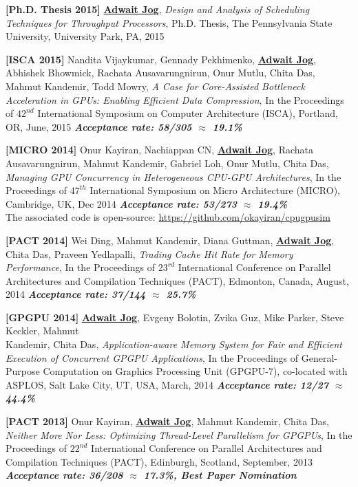 \documentclass[10pt,a4]{article}
\begin{document}
\begin{description}
\item 
{\bf [Ph.D. Thesis 2015]}
{\bf \underline{Adwait Jog}}, {\it Design and Analysis of Scheduling Techniques for Throughput Processors}, 
Ph.D. Thesis, The Pennsylvania State University, University Park, PA, 2015

\item 
{\bf [ISCA 2015]}
Nandita Vijaykumar, Gennady Pekhimenko, {\bf \underline{Adwait Jog}}, Abhishek Bhowmick, Rachata Ausavarungnirun, Onur Mutlu, Chita Das, Mahmut Kandemir, Todd Mowry,
{\it A Case for Core-Assisted Bottleneck Acceleration in GPUs: Enabling Efficient Data Compression},
In the Proceedings of $42^{nd}$ International Symposium on Computer Architecture (ISCA), Portland, OR, June, 2015
\textbf{\textit{Acceptance rate: 58/305 $\approx$ 19.1\%}}

\item{\bf [MICRO 2014]} 
Onur Kayiran, Nachiappan CN, {\bf \underline{Adwait Jog}}, Rachata Ausavarungnirun, 
Mahmut Kandemir, Gabriel Loh, Onur Mutlu, Chita Das, 
{\it Managing GPU Concurrency in Heterogeneous CPU-GPU Architectures}, 
In the Proceedings of $47^{th}$ International Symposium on Micro Architecture (MICRO), Cambridge, UK, Dec 2014
\textbf{\textit{Acceptance rate: 53/273 $\approx$ 19.4\%}} \\
The associated code is open-source: \url{https://github.com/okayiran/cpugpusim}

\item{\bf [PACT 2014]}
Wei Ding, Mahmut Kandemir, Diana Guttman, {\bf \underline{Adwait Jog}}, Chita Das, Praveen Yedlapalli, 
{\it Trading Cache Hit Rate for Memory Performance}, 
In the Proceedings of $23^{rd}$ International Conference on Parallel Architectures and Compilation Techniques (PACT), 
Edmonton, Canada, August, 2014 
\textbf{\textit{Acceptance rate: 37/144 $\approx$ 25.7\%}}

\item{\bf [GPGPU 2014]}
{\bf \underline{Adwait Jog}}, Evgeny Bolotin, Zvika Guz, Mike Parker, Steve Keckler, Mahmut \\ Kandemir, Chita Das, 
{\it Application-aware Memory System for Fair and Efficient Execution of Concurrent GPGPU Applications}, 
In the Proceedings of General-Purpose Computation on Graphics Processing Unit (GPGPU-7), co-located with ASPLOS, Salt Lake City, UT, USA, March, 2014
\textbf{\textit{Acceptance rate: 12/27 $\approx$ 44.4\%}}

\item{\bf [PACT 2013]}
Onur Kayiran, {\bf \underline{Adwait Jog}}, Mahmut Kandemir, Chita Das,
{\it Neither More Nor Less: Optimizing Thread-Level Parallelism for GPGPUs},
In the Proceedings of $22^{nd}$ International Conference on Parallel Architectures and Compilation Techniques (PACT), 
Edinburgh, Scotland, September, 2013 
\textbf{\textit{Acceptance rate: 36/208 $\approx$ 17.3\%, Best Paper Nomination}}


\end{description}
\end{document}
